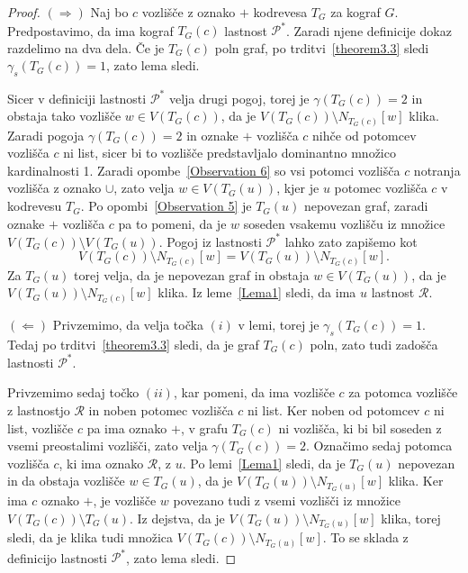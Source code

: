 \documentclass[12pt,a4paper,twoside]{article}
\theoremstyle{definition} %
\theoremstyle{plain} %
\numberwithin{equation}{section}  %
\begin{document}
\begin{proof}
$(\Rightarrow)$ Naj bo $c$ vozlišče z oznako $+$ kodrevesa $T_G$ za kograf $G$. Predpostavimo, da ima kograf $T_G(c)$ lastnost $\mathcal{P^*}$. Zaradi njene definicije dokaz razdelimo na dva dela.
Če je $T_G(c)$ poln graf, po trditvi~\ref{theorem3.3} sledi $\gamma_s(T_G(c)) = 1$, zato lema sledi.

Sicer v definiciji lastnosti $\mathcal{P^*}$ velja drugi pogoj, torej je $\gamma(T_G(c)) = 2$ in obstaja tako vozlišče $w \in V(T_G(c))$, da je $V(T_G(c)) \setminus N_{T_G(c)}[w]$ klika. Zaradi pogoja $\gamma(T_G(c)) = 2$ in oznake $+$ vozlišča $c$ nihče od potomcev vozlišča $c$ ni list, sicer bi to vozlišče predstavljalo dominantno množico kardinalnosti 1. Zaradi opombe~\ref{Observation 6} so vsi potomci vozlišča $c$ notranja vozlišča z oznako $\cup$, zato velja $w \in V(T_G(u))$, kjer je $u$ potomec vozlišča $c$ v kodrevesu $T_G$. Po opombi~\ref{Observation 5} je $T_G(u)$ nepovezan graf, zaradi oznake $+$ vozlišča $c$ pa to pomeni, da je $w$ soseden vsakemu vozlišču iz množice $V(T_G(c)) \setminus V(T_G(u))$. Pogoj iz lastnosti $\mathcal{P^*}$ lahko zato zapišemo kot 
$$V(T_G(c)) \setminus N_{T_G(c)}[w] = V(T_G(u)) \setminus N_{T_G(c)}[w].$$ Za $T_G(u)$ torej velja, da je nepovezan graf in obstaja $w \in V(T_G(u))$, da je $V(T_G(u)) \setminus N_{T_G(c)}[w]$ klika. Iz leme~\ref{Lema1} sledi, da ima $u$ lastnost $\mathcal{R}$.

\medskip
$(\Leftarrow)$ Privzemimo, da velja točka $(i)$ v lemi, torej je $\gamma_s(T_G(c)) = 1$. Tedaj po trditvi~\ref{theorem3.3} sledi, da je graf $T_G(c)$ poln, zato tudi zadošča lastnosti $\mathcal{P^*}$.

Privzemimo sedaj točko $(ii)$, kar pomeni, da ima vozlišče $c$ za potomca vozlišče z lastnostjo $\mathcal{R}$ in noben potomec vozlišča $c$ ni list. Ker noben od potomcev $c$ ni list, vozlišče $c$ pa ima oznako $+$, v grafu $T_G(c)$ ni vozlišča, ki bi bil soseden z vsemi preostalimi vozlišči, zato velja $\gamma(T_G(c)) = 2$. Označimo sedaj potomca vozlišča $c$, ki ima oznako $\mathcal{R}$, z $u$. Po lemi~\ref{Lema1} sledi, da je $T_G(u)$ nepovezan in da obstaja vozlišče $w \in T_G(u)$, da je $V(T_G(u)) \setminus N_{T_G(u)}[w]$ klika. Ker ima $c$ oznako $+$, je vozlišče $w$ povezano tudi z vsemi vozlišči iz množice $V(T_G(c)) \setminus T_G(u)$. Iz dejstva, da je $V(T_G(u)) \setminus N_{T_G(u)}[w]$ klika, torej sledi, da je klika tudi množica $V(T_G(c)) \setminus N_{T_G(u)}[w]$. To se sklada z definicijo lastnosti $\mathcal{P^*}$, zato lema sledi.
\end{proof}
\end{document}
